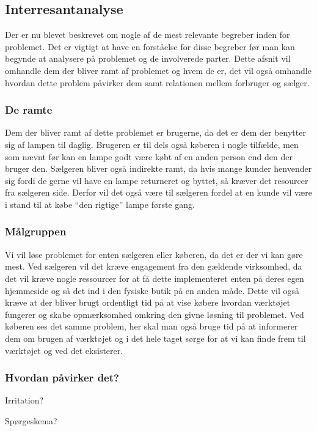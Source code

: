 \subsection{Interresantanalyse}
Der er nu blevet beskrevet om nogle af de mest relevante begreber inden for problemet. Det er vigtigt at have en forståelse for disse begreber før man kan begynde at analysere på problemet og de involverede parter. Dette afsnit vil omhandle dem der bliver ramt af problemet og hvem de er, det vil også omhandle hvordan dette problem påvirker dem samt relationen mellem forbruger og sælger.

\subsubsection{De ramte}
Dem der bliver ramt af dette problemet er brugerne, da det er dem der benytter sig af lampen til daglig. Brugeren er til dels også køberen i nogle tilfælde, men som nævnt før kan en lampe godt være købt af en anden person end den der bruger den.
Sælgeren bliver også indirekte ramt, da hvis mange kunder henvender sig fordi de gerne vil have en lampe returneret og byttet, så kræver det resourcer fra sælgeren side. Derfor vil det også være til sælgeren fordel at en kunde vil være i stand til at købe “den rigtige” lampe første gang.
 
\subsubsection{Målgruppen}
Vi vil løse problemet for enten sælgeren eller køberen, da det er der vi kan gøre mest. Ved sælgeren vil det kræve engagement fra den gældende virksomhed, da det vil kræve nogle ressourcer for at få dette implementeret enten på deres egen hjemmeside og så det ind i den fysiske butik på en anden måde. Dette vil også kræve at der bliver brugt ordentligt tid på at vise købere hvordan værktøjet fungerer og skabe opmærksomhed omkring den givne løsning til problemet.
Ved køberen ses det samme problem, her skal man også bruge tid på at informerer dem om brugen af værktøjet og i det hele taget sørge for at vi kan finde frem til værktøjet og ved det eksisterer.
 
\subsubsection{Hvordan påvirker det?}

Irritation?
 
Spørgeskema?
 
